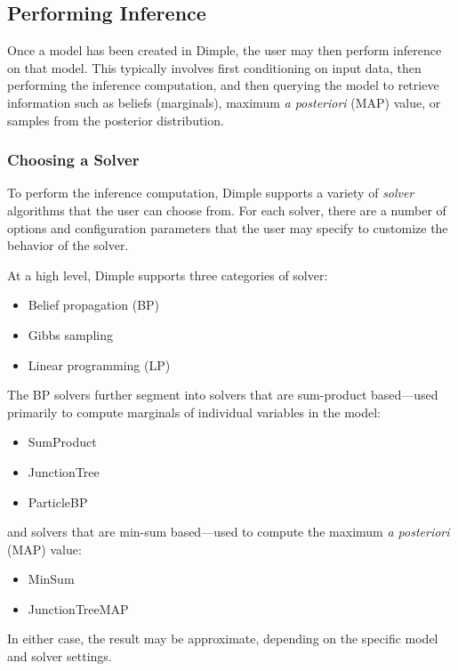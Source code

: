 \subsection{Performing Inference}

Once a model has been created in Dimple, the user may then perform inference on that model.  This typically involves first conditioning on input data, then performing the inference computation, and then querying the model to retrieve information such as beliefs (marginals), maximum \emph{a posteriori} (MAP) value, or samples from the posterior distribution.

\subsubsection{Choosing a Solver}
\label{sec:Solvers}

To perform the inference computation, Dimple supports a variety of \emph{solver} algorithms that the user can choose from.  For each solver, there are a number of options and configuration parameters that the user may specify to customize the behavior of the solver.

At a high level, Dimple supports three categories of solver:
%
\begin{itemize}
\item Belief propagation (BP)
\item Gibbs sampling
\item Linear programming (LP)
\end{itemize}

The BP solvers further segment into solvers that are sum-product based---used primarily to compute marginals of individual variables in the model:
%
 \begin{itemize}
 \item SumProduct
 \item JunctionTree
 \item ParticleBP
 \end{itemize}
 
 and solvers that are min-sum based---used to compute the maximum \emph{a posteriori} (MAP) value:
 \begin{itemize}
 \item MinSum
 \item JunctionTreeMAP
 \end{itemize}

In either case, the result may be approximate, depending on the specific model and solver settings.

